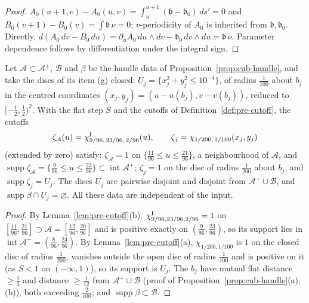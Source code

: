 \begin{proof}
$A_0(u+1,v)-A_0(u,v)=\int_u^{u+1}(\mathfrak b-\mathfrak b_0)\,ds'=0$ and $B_0(v+1)-B_0(v)=\int\mathfrak b\,\nu=0$; $v$-periodicity of $A_0$ is inherited from $\mathfrak b,\mathfrak b_0$. Directly, $d(A_0\,dv-B_0\,du)=\partial_uA_0\,du\wedge dv-\mathfrak b_0\,dv\wedge du=\mathfrak b\,\nu$. Parameter dependence follows by differentiation under the integral sign.
\end{proof}

\begin{proposition}\label{prop:fer-handle}
Let $\mathcal A\subset\mathcal A^+$, $\mathcal B$ and $\beta$ be the handle data of Proposition~\ref{prop:cub-handle}, and take
the discs of its item (g) closed: $U_j=\{x_j^2+y_j^2\le10^{-4}\}$, of radius $\frac1{100}$ about $b_j$ in the centred coordinates
$(x_j,y_j)=(u-u(b_j),v-v(b_j))$, reduced to $[-\frac12,\frac12)^2$. With the flat step $S$ and the cutoffs of
Definition~\ref{def:pre-cutoff}, the cutoffs
\[
 \zeta_{\mathcal A}(u)=\chi^{\rm I}_{9/96,\,23/96,\,2/96}(u),\qquad \zeta_j=\chi_{1/200,\,1/100}(x_j,y_j)
\]
(extended by zero) satisfy: $\zeta_{\mathcal A}=1$ on $\{\frac{11}{96}\le u\le\frac{21}{96}\}$, a neighbourhood of $\mathcal A$, and
$\operatorname{supp}\zeta_{\mathcal A}=\{\frac9{96}\le u\le\frac{23}{96}\}\subset\operatorname{int}\mathcal A^+$; $\zeta_j=1$ on the disc
of radius $\frac1{200}$ about $b_j$, and $\operatorname{supp}\zeta_j=U_j$. The discs $U_j$ are pairwise disjoint and disjoint from
$\mathcal A^+\cup\mathcal B$, and $\operatorname{supp}\beta\cap U_j=\varnothing$. All these data are independent of the input.
\end{proposition}

\begin{proof}
By Lemma~\ref{lem:pre-cutoff}(b), $\chi^{\rm I}_{9/96,23/96,2/96}=1$ on $[\frac{11}{96},\frac{21}{96}]\supset\mathcal A=[\frac{12}{96},\frac{20}{96}]$ and is positive exactly on $(\frac9{96},\frac{23}{96})$, so its support lies in $\operatorname{int}\mathcal A^+=(\frac8{96},\frac{24}{96})$. By Lemma~\ref{lem:pre-cutoff}(a), $\chi_{1/200,1/100}$ is $1$ on the closed disc of radius $\frac1{200}$, vanishes outside the open disc of radius $\frac1{100}$ and is positive on it (as $S<1$ on $(-\infty,1)$), so its support is $U_j$. The $b_j$ have mutual flat distance $\ge\frac13$ and distance $\ge\frac1{12}$ from $\mathcal A^+\cup\mathcal B$ (proof of Proposition~\ref{prop:cub-handle}(a),(b)), both exceeding $\frac2{100}$; and $\operatorname{supp}\beta\subset\mathcal B$.
\end{proof}

